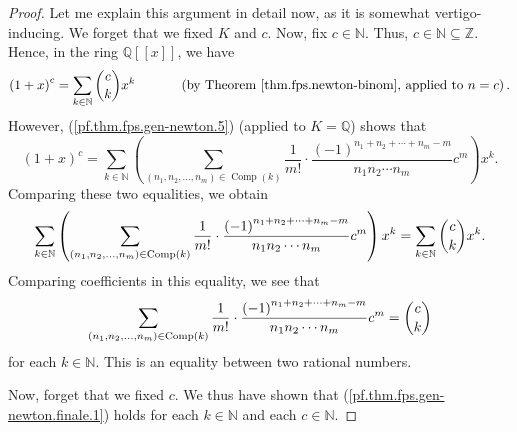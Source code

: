 \begin{proof}
Let me explain this argument in detail now, as it is somewhat
vertigo-inducing. We forget that we fixed $K$ and $c$. Now, fix $c\in
\mathbb{N}$. Thus, $c\in\mathbb{N}\subseteq\mathbb{Z}$. Hence, in the ring
$\mathbb{Q}\left[  \left[  x\right]  \right]  $, we have%
\[
\left(  1+x\right)  ^{c}=\sum_{k\in\mathbb{N}}\dbinom{c}{k}x^{k}%
\ \ \ \ \ \ \ \ \ \ \left(  \text{by Theorem \ref{thm.fps.newton-binom},
applied to }n=c\right)  .
\]
However, (\ref{pf.thm.fps.gen-newton.5}) (applied to $K=\mathbb{Q}$) shows
that%
\[
\left(  1+x\right)  ^{c}=\sum_{k\in\mathbb{N}}\left(  \sum_{\left(
n_{1},n_{2},\ldots,n_{m}\right)  \in\operatorname*{Comp}\left(  k\right)
}\dfrac{1}{m!}\cdot\dfrac{\left(  -1\right)  ^{n_{1}+n_{2}+\cdots+n_{m}-m}%
}{n_{1}n_{2}\cdots n_{m}}c^{m}\right)  x^{k}.
\]
Comparing these two equalities, we obtain%
\[
\sum_{k\in\mathbb{N}}\left(  \sum_{\left(  n_{1},n_{2},\ldots,n_{m}\right)
\in\operatorname*{Comp}\left(  k\right)  }\dfrac{1}{m!}\cdot\dfrac{\left(
-1\right)  ^{n_{1}+n_{2}+\cdots+n_{m}-m}}{n_{1}n_{2}\cdots n_{m}}c^{m}\right)
x^{k}=\sum_{k\in\mathbb{N}}\dbinom{c}{k}x^{k}.
\]
Comparing coefficients in this equality, we see that%
\begin{equation}
\sum_{\left(  n_{1},n_{2},\ldots,n_{m}\right)  \in\operatorname*{Comp}\left(
k\right)  }\dfrac{1}{m!}\cdot\dfrac{\left(  -1\right)  ^{n_{1}+n_{2}%
+\cdots+n_{m}-m}}{n_{1}n_{2}\cdots n_{m}}c^{m}=\dbinom{c}{k}
\label{pf.thm.fps.gen-newton.finale.1}%
\end{equation}
for each $k\in\mathbb{N}$. This is an equality between two rational numbers.

Now, forget that we fixed $c$. We thus have shown that
(\ref{pf.thm.fps.gen-newton.finale.1}) holds for each $k\in\mathbb{N}$ and
each $c\in\mathbb{N}$.


\end{proof}
